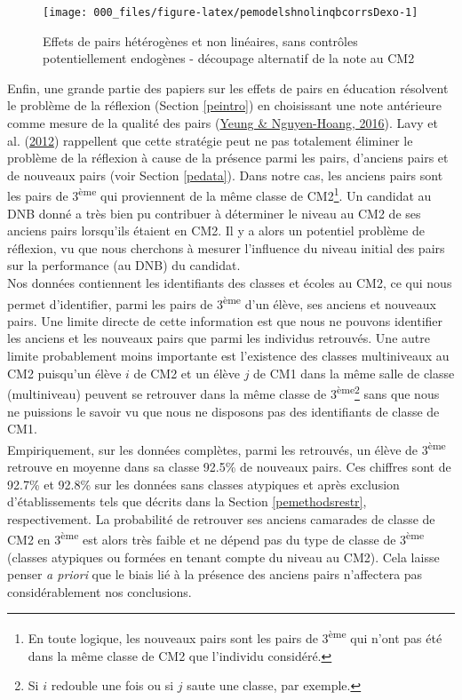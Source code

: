 \documentclass[
]{book}
\begin{document}
\begin{figure}[H]

{\centering \texttt{[image: 000\_files/figure-latex/pemodelshnolinqbcorrsDexo-1]} 

}

\caption{Effets de pairs hétérogènes et non linéaires, sans contrôles potentiellement endogènes - découpage alternatif de la note au CM2}\label{fig:pemodelshnolinqbcorrsDexo}
\end{figure}

\quad Enfin, une grande partie des papiers sur les effets de pairs en éducation résolvent le problème de la réflexion (Section \ref{peintro}) en choisissant une note antérieure comme mesure de la qualité des pairs (\protect\hyperlink{ref-YEU:NGU:16}{Yeung \& Nguyen-Hoang, 2016}). Lavy et al. (\protect\hyperlink{ref-LAV:eal:12}{2012}) rappellent que cette stratégie peut ne pas totalement éliminer le problème de la réflexion à cause de la présence parmi les pairs, d'anciens pairs et de nouveaux pairs (voir Section \ref{pedata}). Dans notre cas, les anciens pairs sont les pairs de 3\textsuperscript{ème} qui proviennent de la même classe de CM2\footnote{En toute logique, les nouveaux pairs sont les pairs de 3\textsuperscript{ème} qui n'ont pas été dans la même classe de CM2 que l'individu considéré.}. Un candidat au DNB donné a très bien pu contribuer à déterminer le niveau au CM2 de ses anciens pairs lorsqu'ils étaient en CM2. Il y a alors un potentiel problème de réflexion, vu que nous cherchons à mesurer l'influence du niveau initial des pairs sur la performance (au DNB) du candidat.\\
Nos données contiennent les identifiants des classes et écoles au CM2, ce qui nous permet d'identifier, parmi les pairs de 3\textsuperscript{ème} d'un élève, ses anciens et nouveaux pairs. Une limite directe de cette information est que nous ne pouvons identifier les anciens et les nouveaux pairs que parmi les individus retrouvés. Une autre limite probablement moins importante est l'existence des classes multiniveaux au CM2 puisqu'un élève \(i\) de CM2 et un élève \(j\) de CM1 dans la même salle de classe (multiniveau) peuvent se retrouver dans la même classe de 3\textsuperscript{ème}\footnote{Si \(i\) redouble une fois ou si \(j\) saute une classe, par exemple.} sans que nous ne puissions le savoir vu que nous ne disposons pas des identifiants de classe de CM1.\\
Empiriquement, sur les données complètes, parmi les retrouvés, un élève de 3\textsuperscript{ème} retrouve en moyenne dans sa classe 92.5\% de nouveaux pairs. Ces chiffres sont de 92.7\% et 92.8\% sur les données sans classes atypiques et après exclusion d'établissements tels que décrits dans la Section \ref{pemethodsrestr}, respectivement. La probabilité de retrouver ses anciens camarades de classe de CM2 en 3\textsuperscript{ème} est alors très faible et ne dépend pas du type de classe de 3\textsuperscript{ème} (classes atypiques ou formées en tenant compte du niveau au CM2). Cela laisse penser \emph{a priori} que le biais lié à la présence des anciens pairs n'affectera pas considérablement nos conclusions.\\
\end{document}
